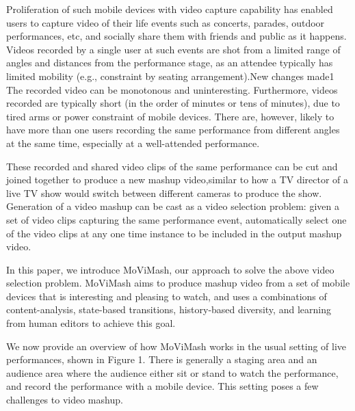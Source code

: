 \documentclass{sig-alternate}
\begin{document}
 Proliferation of such mobile devices with video capture capability has enabled users to capture video of their life events such as concerts, parades, outdoor performances, etc, and socially share them with friends and public as it happens. Videos recorded by a single user at such events are shot from a limited range of angles and distances from the performance stage, as an attendee typically has limited mobility (e.g., constraint by seating arrangement).New changes made1
The recorded video can be monotonous and uninteresting. Furthermore, videos recorded are typically short (in the order of minutes or tens of minutes), due to tired arms or power constraint of mobile devices. There are, however, likely to have more than one users recording the same performance from different angles at the same time, especially at a well-attended performance.

These recorded and shared video clips of the same performance can be cut and joined together to produce a new mashup video,similar to how a TV director of a live TV show would switch between different cameras to produce the show. Generation of a video mashup can be cast as a video selection problem: given a set of video clips capturing the same performance event, automatically select one of the video clips at any one time instance to be included
in the output mashup video.

In this paper, we introduce MoViMash, our approach to solve the above video selection problem. MoViMash aims to produce mashup video from a set of mobile devices that is interesting and pleasing to watch, and uses a combinations of content-analysis, state-based transitions, history-based diversity, and learning from human editors to achieve this goal.

We now provide an overview of how MoViMash works in the usual setting of live performances, shown in Figure 1. There is generally a staging area and an audience area where the audience either sit or stand to watch the performance, and record the performance with a mobile device. This setting poses a few challenges to video mashup.
\end{document}
